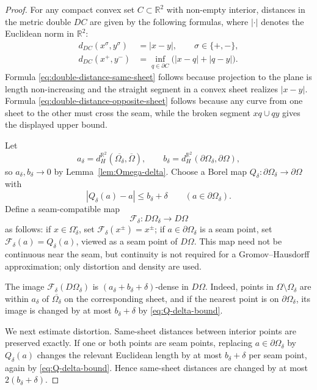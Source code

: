 \documentclass[11pt]{amsart}
\numberwithin{equation}{section}
\newcommand{\R}{\mathbb R}
\newcommand{\Om}{\Omega}
\begin{document}
\begin{proof}
For any compact convex set $C\subset\R^2$ with non-empty interior, distances in
the metric double $DC$ are given by the following formulas, where $|\cdot|$
denotes the Euclidean norm in $\R^2$:
\begin{subequations}
\begin{align}
d_{DC}(x^\sigma,y^\sigma)&=|x-y|,
\qquad \sigma\in\{+,-\},\label{eq:double-distance-same-sheet}\\
d_{DC}(x^+,y^-)&=\inf_{q\in\partial C}\bigl(|x-q|+|q-y|\bigr).\label{eq:double-distance-opposite-sheet}
\end{align}
\end{subequations}
Formula \eqref{eq:double-distance-same-sheet} follows because projection to the
plane is length non-increasing and the straight segment in a convex sheet realizes
$|x-y|$.  Formula \eqref{eq:double-distance-opposite-sheet} follows because any
curve from one sheet to the other must cross the seam, while the broken segment
$xq\cup qy$ gives the displayed upper bound.

Let
$$
a_\delta=d_H^{\R^2}(\overline{\Om_\delta},\overline\Om),
\qquad
b_\delta=d_H^{\R^2}(\partial\Om_\delta,\partial\Om),
$$
so $a_\delta,b_\delta\to0$ by Lemma~\ref{lem:Omega-delta}.  Choose a Borel map
$Q_\delta:\partial\Om_\delta\to\partial\Om$ with
\begin{equation}\label{eq:Q-delta-bound}
|Q_\delta(a)-a|\le b_\delta+\delta
\qquad(a\in\partial\Om_\delta).
\end{equation}
Define a seam-compatible map
$$
\mathcal F_\delta:D\Om_\delta\to D\Om
$$
as follows: if $x\in\Om_\delta^\circ$, set $\mathcal F_\delta(x^\pm)=x^\pm$; if
$a\in\partial\Om_\delta$ is a seam point, set $\mathcal F_\delta(a)=Q_\delta(a)$, viewed
as a seam point of $D\Om$.  This map need not be continuous near the seam, but
continuity is not required for a Gromov--Hausdorff approximation; only distortion
and density are used.

The image $\mathcal F_\delta(D\Om_\delta)$ is $(a_\delta+b_\delta+
\delta)$-dense in $D\Om$.  Indeed, points in $\Om\setminus\Om_\delta$ are within
$a_\delta$ of $\overline{\Om_\delta}$ on the corresponding sheet, and if the
nearest point is on $\partial\Om_\delta$, its image is changed by at most
$b_\delta+\delta$ by \eqref{eq:Q-delta-bound}.

We next estimate distortion.  Same-sheet distances between interior points are
preserved exactly.  If one or both points are seam points, replacing
$a\in\partial\Om_\delta$ by $Q_\delta(a)$ changes the relevant Euclidean length
by at most $b_\delta+\delta$ per seam point, again by \eqref{eq:Q-delta-bound}.
Hence same-sheet distances are changed by at most $2(b_\delta+\delta)$.


\end{proof}
\end{document}
